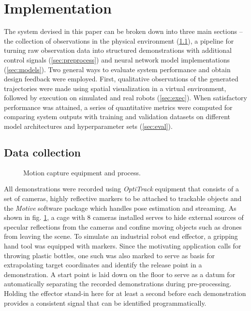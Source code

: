 \documentclass{article}
\begin{document}
\section{Implementation}
\label{sec:materials}

The system devised in this paper can be broken down into three main sections -- the collection of observations in the physical environment (\ref{sec:collection}), a pipeline for turning raw observation data into structured demonstrations with additional control signals (\ref{sec:preprocess}) and neural network model implementations (\ref{sec:models}). Two general ways to evaluate system performance and obtain design feedback were employed. First, qualitative observations of the generated trajectories were made using spatial visualization in a virtual environment, followed by execution on simulated and real robots (\ref{sec:exec}). When satisfactory performance was attained, a series of quantitative metrics were computed for comparing system outputs with training and validation datasets on different model architectures and hyperparameter sets (\ref{sec:eval}).

\subsection{Data collection}
\label{sec:collection}

\begin{figure}
	\centering
	\caption{Motion capture equipment and process. }
	\label{fig:fig1}
\end{figure}

All demonstrations were recorded using \emph{OptiTrack} equipment that consists of a set of cameras, highly reflective markers to be attached to trackable objects and the \emph{Motive} software package which handles pose estimation and streaming. As shown in fig. \ref{fig:fig1}, a cage with 8 cameras installed serves to hide external sources of specular reflections from the cameras and confine moving objects such as drones from leaving the scene. To simulate an industrial robot end effector, a gripping hand tool was equipped with markers. Since the motivating application calls for throwing plastic bottles, one such was also marked to serve as basis for extrapolating target coordinates and identify the release point in a demonstration. A start point is laid down on the floor to serve as a datum for automatically separating the recorded demonstrations during pre-processing. Holding the effector stand-in here for at least a second before each demonstration provides a consistent signal that can be identified programmatically.
\end{document}
